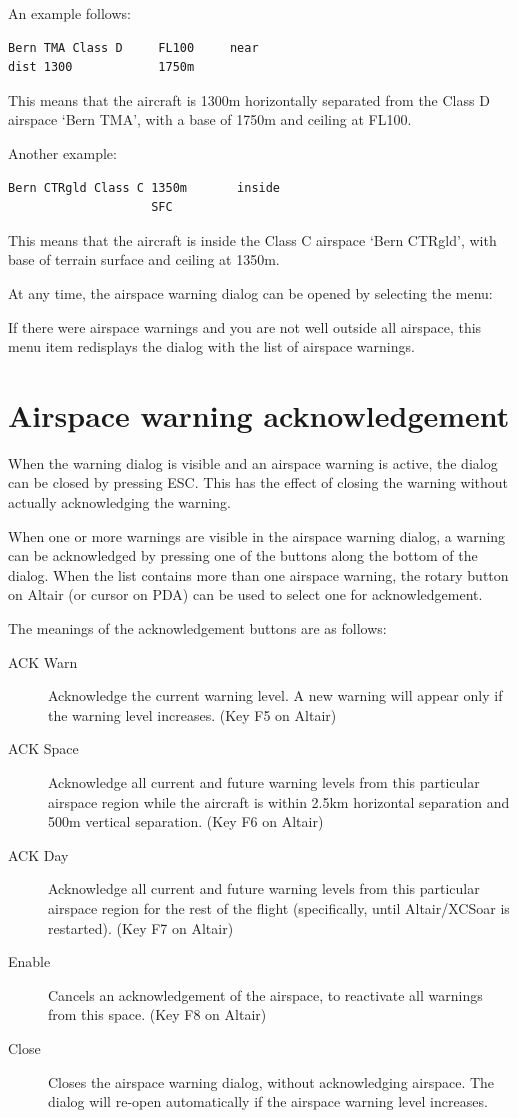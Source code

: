 \documentclass[a4paper,12pt]{refrep}
\begin{document}
An example follows:
\begin{verbatim}
Bern TMA Class D     FL100     near
dist 1300            1750m 
\end{verbatim}

This means that the aircraft is 1300m horizontally separated from the Class D airspace
`Bern TMA', with a base of 1750m and ceiling at FL100.

Another example:
\begin{verbatim}
Bern CTRgld Class C 1350m	    inside
                    SFC
\end{verbatim}

This means that the aircraft is inside the Class C airspace `Bern
CTRgld', with base of terrain surface and ceiling at 1350m.

At any time, the airspace warning dialog can be opened by selecting
the menu:

\blink{}

If there were airspace warnings and you are not well outside all airspace, this
menu item redisplays the dialog with the list of airspace warnings.


\section{Airspace warning acknowledgement}

When the warning dialog is visible and an airspace warning is active, the
dialog can be closed by pressing ESC.  This has the effect of closing the
warning without actually acknowledging the warning.  

When one or more warnings are visible in the airspace warning dialog,
a warning can be acknowledged by pressing one of the buttons along the bottom
of the dialog.  When the list contains more than one airspace warning,
the rotary button on Altair (or cursor on PDA) can be used to select one
for acknowledgement.

The meanings of the acknowledgement buttons are as follows:
\begin{description}
\item[ACK Warn]  Acknowledge the current warning level.  A new warning will appear
only if the warning level increases.  (Key F5 on Altair)
\item[ACK Space]  Acknowledge all current and future warning levels from this 
particular airspace region while the aircraft is within 2.5km horizontal separation
and 500m vertical separation. (Key F6 on Altair)
\item[ACK Day]  Acknowledge all current and future warning levels from this particular
airspace region for the rest of the flight (specifically, until Altair/XCSoar 
is restarted). (Key F7 on Altair)
\item[Enable]  Cancels an acknowledgement of the airspace, to reactivate all warnings
from this space. (Key F8 on Altair)
\item[Close] Closes the airspace warning dialog, without acknowledging airspace.
  The dialog will re-open automatically if the airspace warning level increases.
\end{description}
\end{document}
